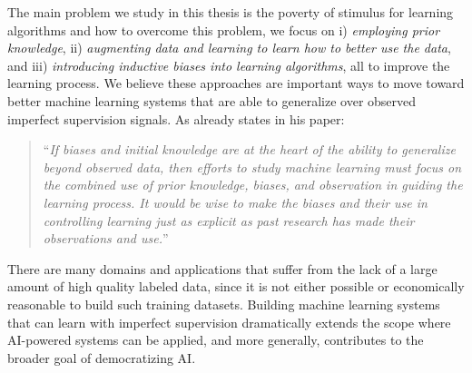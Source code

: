 \medskip

The main problem we study in this thesis is the poverty of stimulus for learning algorithms and how to overcome this problem, we focus on  i) \emph{employing prior knowledge}, ii) \emph{augmenting data and learning to learn how to better use the data}, and iii) \emph{introducing inductive biases into learning algorithms}, all to improve the learning process. We believe these approaches are important ways to move toward better machine learning systems that are able to generalize over observed imperfect supervision signals. As \citet{Mitchell80theneed} already states in his paper:
\begin{quote}
``\emph{If biases and initial knowledge are at the heart of the ability to generalize beyond observed data, then efforts to study machine learning must focus on the combined use of prior knowledge, biases, and observation in guiding the learning process. It would be wise to make the biases and their use in controlling learning just as explicit as past research has made their observations and use.}''
\end{quote}

There are many domains and applications that suffer from the lack of a large amount of high quality labeled data, since it is not either possible or economically reasonable to build such training datasets. Building machine learning systems that can learn with imperfect supervision dramatically extends the scope where AI-powered systems can be applied, and more generally, contributes to the broader goal of democratizing AI.

